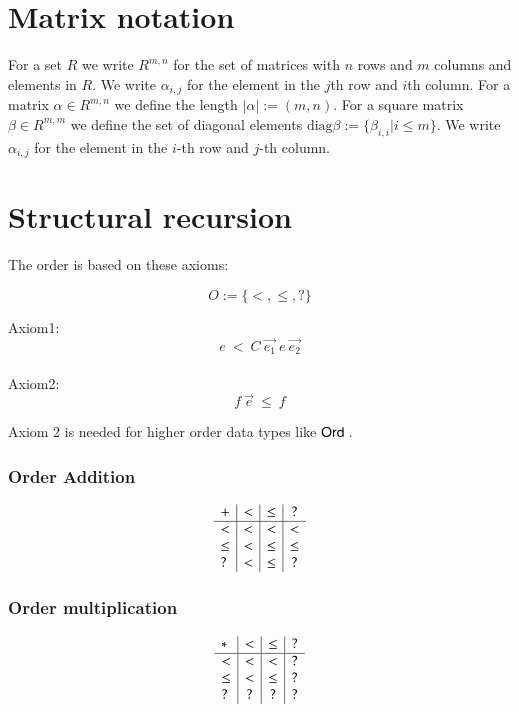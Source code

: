 \section{Matrix notation}

\newcommand{\diag}{\mathrm{diag}}

For a set $R$ we write $R^{m,n}$ for the set of matrices with $n$ rows and $m$ columns and elements in $R$.
We write $\alpha_{i,j}$ for the element in the $j$th row and $i$th column.
For a matrix $\alpha \in R^{m,n}$ we define the length $|\alpha| := (m,n)$.
For a square matrix $\beta \in R^{m,m}$ we define the set of diagonal elements $\diag \beta := \{ \beta_{i,i} \vert i \leq m\}$.
We write $\alpha_{i,j}$ for the element in the $i$-th row and $j$-th column.


\newcommand{\order}{\mathrm{Order}}
\section{Structural recursion}

The order is based on these axioms:
\begin{definition}[Order]
\[ O := \{ < , \leq , ? \} \]
\end{definition}
Axiom1:
\[ e \: < \: C \: \vec{e_1} \: e \: \vec{e_2} \]
\\
Axiom2:
\[ f \: \vec{e} \: \leq \: f \] 

Axiom 2 is needed for higher order data types like $\mathsf{Ord}\:$.

\subsubsection{Order Addition}
\[
\begin{array}{l | c |c | c }

 +    &  <   &  \leq   &  ? \\
 \hline 
 <    &  <   & <       &  <   \\
 \leq &  <   & \leq    &  \leq \\
 ?    &  <   & \leq    &  ?
\end{array}
\]

\subsubsection{Order multiplication}
\[
\begin{array}{l | c |c | c}
 *   &  <  &  \leq & ? \\
\hline
  <   & <    & <    &   ? \\
 \leq & <    & \leq &   ?  \\
 ?    & ?    & ?    &   ?
\end{array}
\]


